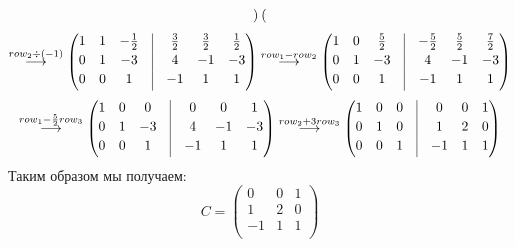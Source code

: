 \documentclass[a4paper,11pt]{article}
\begin{document}
\begin{gather*}
\begin{pmatrix}
\end{pmatrix}
\\[3pt]
\stackrel{ row_{2} \div (-1) }{\longrightarrow}
\begin{pmatrix}
1 & 1 & -\frac{1}{2} & \vrule & \frac{3}{2} & \frac{3}{2} & \frac{1}{2} \\[2pt]
0 & 1 & -3 & \vrule & 4 & -1 & -3 \\[2pt]
0 & 0 & 1 & \vrule & -1 & 1 & 1 \\[2pt]
\end{pmatrix}
\stackrel{ row_{1} - row_{2} }{\longrightarrow}
\begin{pmatrix}
1 & 0 & \frac{5}{2} & \vrule & -\frac{5}{2} & \frac{5}{2} & \frac{7}{2} \\[2pt]
0 & 1 & -3 & \vrule & 4 & -1 & -3 \\[2pt]
0 & 0 & 1 & \vrule & -1 & 1 & 1 \\[2pt]
\end{pmatrix}
\\[3pt]
\stackrel{ row_{1} - \frac{5}{2}row_{3} }{\longrightarrow}
\begin{pmatrix}
1 & 0 & 0 & \vrule & 0 & 0 & 1 \\[2pt]
0 & 1 & -3 & \vrule & 4 & -1 & -3 \\[2pt]
0 & 0 & 1 & \vrule & -1 & 1 & 1 \\[2pt]
\end{pmatrix}
\stackrel{ row_{2} + 3row_{3} }{\longrightarrow}
\begin{pmatrix}
1 & 0 & 0 & \vrule & 0 & 0 & 1 \\[2pt]
0 & 1 & 0 & \vrule & 1 & 2 & 0 \\[2pt]
0 & 0 & 1 & \vrule & -1 & 1 & 1 \\[2pt]
\end{pmatrix}
\end{gather*}
Таким образом мы получаем: 
\[
C = 
\begin{pmatrix}
0 & 0 & 1 \\
1 & 2 & 0 \\
-1 & 1 & 1 \\
\end{pmatrix}
\]
\end{document}
